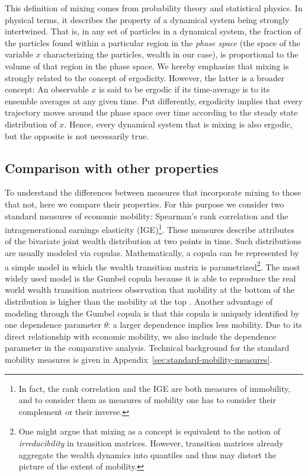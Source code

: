 \documentclass[11pt]{article}
\numberwithin{equation}{section}
\begin{document}
This definition of mixing comes from probability theory and statistical physics. In physical terms, it describes the property of a dynamical system being strongly intertwined. That is, in any set of particles in a dynamical system, the fraction of the particles found within a particular region in the \textit{phase space} (the space of the variable $x$ characterizing the particles, wealth in our case), is proportional to the volume of that region in the phase space. We hereby emphasize that mixing is strongly related to the concept of ergodicity. However, the latter is a broader concept: An observable $x$ is said to be ergodic if its time-average is to its ensemble averages at any given time. Put differently, ergodicity implies that every trajectory moves around the phase space over time according to the steady state distribution of $x$. Hence, every dynamical system that is mixing is also ergodic, but the opposite is not necessarily true.

\subsection{Comparison with other properties}

To understand the differences between measures that incorporate mixing to those that not, here we compare their properties. For this purpose we consider two standard measures of economic mobility: Spearman's rank correlation and the intragenerational earnings elasticity (IGE)\footnote{In fact, the rank correlation and the IGE are both measures of immobility, and to consider them as measures of mobility one has to consider their complement or their inverse.}. These measures describe attributes of the bivariate joint wealth distribution at two points in time. Such distributions are usually modeled via copulas. Mathematically, a copula can be represented by a simple model in which the wealth transition matrix is parametrized\footnote{One might argue that mixing as a concept is equivalent to the notion of \textit{irreducibility} in transition matrices. However, transition matrices already aggregate the wealth dynamics into quantiles and thus may distort the picture of the extent of mobility.}. The most widely used model is the Gumbel copula because it is able to reproduce the real world wealth transition matrices observation that mobility at the bottom of the distribution is higher than the mobility at the top \citep{JanttiJenkins2015}. Another advantage of modeling through the Gumbel copula is that this copula is uniquely identified by one dependence parameter $\theta$: a larger dependence implies less mobility. Due to its direct relationship with economic mobility, we also include the dependence parameter in the comparative analysis. Technical background for the standard mobility measures is given in Appendix~\ref{sec:standard-mobility-measures}.
\end{document}
